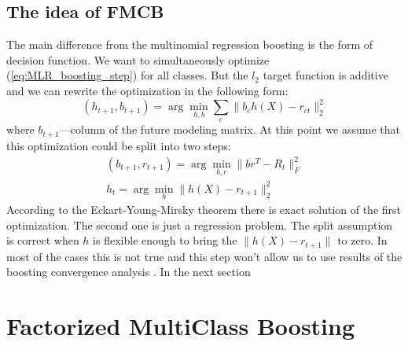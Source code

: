 \documentclass{article}
\begin{document}
\subsection{The idea of FMCB}
The main difference from the multinomial regression boosting is the form of decision function. We want to simultaneously optimize (\ref{eq:MLR_boosting_step}) for all classes. But the $l_2$ target function is additive and we can rewrite the optimization in the following form:
\begin{equation}
(h_{t+1},b_{t+1}) = \arg \min_{h,b} \sum_c \|b_ch(X) - r_{ct}\|_2^2
\end{equation}
where $b_{t+1}$---column of the future modeling matrix. At this point we assume that this optimization could be split into two steps:
\begin{equation}\begin{array}{l}
(b_{t+1},r_{t+1}) = \arg \min_{b,r} \|b r^T - R_t\|_F^2 \\
h_t	= \arg \min_{h} \|h(X) - r_{t+1}\|_2^2
\end{array}\end{equation}
According to the Eckart-Young-Mirsky theorem \cite{Eckart1936} there is exact solution of the first optimization. The second one is just a regression problem. The split assumption is correct when $h$ is flexible enough to bring the $\|h(X) - r_{t+1}\|$ to zero. In most of the cases this is not true and this step won't allow us to use results of the boosting convergence analysis \cite{??}. In the next section
\label{sec:fmcb_idea}


\section{Factorized MultiClass Boosting}
\end{document}

